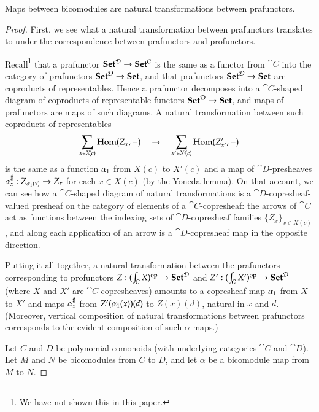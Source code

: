 \documentclass{amsart}
\begin{document}
\begin{prop}
  Maps between bicomodules are natural transformations between prafunctors.
\end{prop}
\begin{proof}
  First, we see what a natural transformation between prafunctors
  translates to under the correspondence between prafunctors and
  profunctors.

  Recall\footnote{We have not shown this in this paper.} that a
  prafunctor ${\normalfont\mathbf{Set}}^{\mathcal{D}} \to {\normalfont\mathbf{Set}}^{\mathcal{C}}$ is the same as a
  functor from $\cat{C}$ into the category of prafunctors
  ${\normalfont\mathbf{Set}}^{\mathcal{D}} \to {\normalfont\mathbf{Set}}$, and that prafunctors
  ${\normalfont\mathbf{Set}}^{\mathcal{D}} \to {\normalfont\mathbf{Set}}$ are coproducts of representables. Hence a
  prafunctor decomposes into a $\cat{C}$-shaped diagram of coproducts
  of representable functors ${\normalfont\mathbf{Set}}^{\mathcal{D}} \to {\normalfont\mathbf{Set}}$, and maps of
  prafunctors are maps of such diagrams. A natural transformation
  between such coproducts of representables
  \[\sum_{x \in X\!(c)}\operatorname{Hom}(Z_x, -) \quad \to \quad \sum_{x' \in X'\!(c)}\operatorname{Hom}(Z_{x'}',
    -)\] is the same as a function ${\alpha}_1$ from $X(c)$ to
  $X'(c)$ and a map of $\cat{D}$-presheaves
  ${\alpha}^\sharp_{x}: {Z_{{\alpha}_1(x)} \to Z_x}$ for each $x \in X(c)$ (by the
  Yoneda lemma). On that account, we can see how a $\cat{C}$-shaped
  diagram of natural transformations is a $\cat{D}$-copresheaf-valued
  presheaf on the category of elements of a $\cat{C}$-copresheaf: the
  arrows of $\cat{C}$ act as functions between the indexing sets of
  $\cat{D}$-copresheaf families $\{Z_x\}_{x \in X(c)}$, and along each
  application of an arrow is a $\cat{D}$-copresheaf map in the
  opposite direction.

  Putting it all together, a natural transformation between the
  prafunctors corresponding to profunctors
  $Z : (\int_{\mathcal{C}} X)^{\mathrm{op}} \to {\normalfont\mathbf{Set}}^{\mathcal{D}}$ and
  $Z' : (\int_{\mathcal{C}} X')^{\mathrm{op}} \to {\normalfont\mathbf{Set}}^{\mathcal{D}}$ (where $X$ and
  $X'$ are $\cat{C}$-copresheaves) amounts to a copresheaf map
  ${\alpha}_1$ from $X$ to $X'$ and maps ${\alpha}^\sharp_{x}$
  from $Z'({\alpha}_1(x))(d)$ to $Z(x)(d)$, natural in $x$ and
  $d$. (Moreover, vertical composition of natural transformations
  between prafunctors corresponds to the evident composition of such
  $\alpha$ maps.)

  Let $C$ and $D$ be polynomial comonoids (with underlying
  categories $\cat{C}$ and $\cat{D}$). Let $M$ and $N$ be bicomodules
  from $C$ to $D$, and let $\alpha$ be a bicomodule map from $M$ to
  $N$.


\end{proof}
\end{document}
